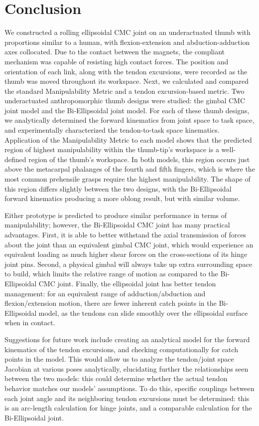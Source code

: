 \documentclass[journal]{IEEEtran}
\begin{document}
\section{Conclusion}
\label{conclusion}

We constructed a rolling ellipsoidal CMC joint on an underactuated thumb with proportions similar to a human, with flexion-extension and abduction-adduction axes collocated. Due to the contact between the magnets, the compliant mechanism was capable of resisting high contact forces. The position and orientation of each link, along with the tendon excursions, were recorded as the thumb was moved throughout its workspace. Next, we calculated and compared the standard Manipulability Metric and a tendon excursion-based metric. Two underactuated anthropomorphic thumb designs were studied: the gimbal CMC joint model and the Bi-Ellipsoidal joint model. For each of these thumb designs, we analytically determined the forward kinematics from joint space to task space, and experimentally characterized the tendon-to-task space kinematics. Application of the Manipulability Metric to each model shows that the predicted region of highest manipulability within the thumb-tip's workspace is a well-defined region of the thumb's workspace. In both models, this region occurs just above the metacarpal phalanges of the fourth and fifth fingers, which is where the most common prehensile grasps require the highest manipulability. The shape of this region differs slightly between the two designs, with the Bi-Ellipsoidal forward kinematics producing a more oblong result, but with similar volume.

Either prototype is predicted to produce similar performance in terms of manipulability; however, the Bi-Ellipsoidal CMC joint has many practical advantages. First, it is able to better withstand the axial transmission of forces about the joint than an equivalent gimbal CMC joint, which would experience an equivalent loading as much higher shear forces on the cross-sections of its hinge joint pins. Second, a physical gimbal will always take up extra surrounding space to build, which limits the relative range of motion as compared to the Bi-Ellipsoidal CMC joint. Finally, the ellipsoidal joint has better tendon management: for an equivalent range of adduction/abduction and flexion/extension motion, there are fewer inherent catch points in the Bi-Ellipsoidal model, as the tendons can slide smoothly over the ellipsoidal surface when in contact.

Suggestions for future work include creating an analytical model for the forward kinematics of the tendon excursions, and checking computationally for catch points in the model. This would allow us to analyze the tendon/joint space Jacobian at various poses analytically, elucidating further the relationships seen between the two models: this could determine whether the actual tendon behavior matches our models' assumptions. To do this, specific couplings between each joint angle and its neighboring tendon excursions must be determined: this is an arc-length calculation for hinge joints, and a comparable calculation for the Bi-Ellipsoidal joint. 
\end{document}

